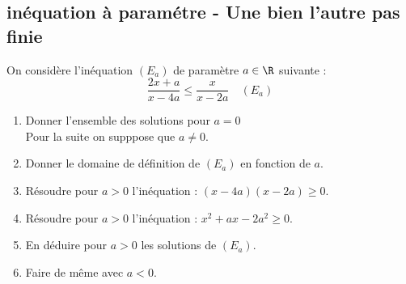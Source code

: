 \subsection{inéquation à paramétre - Une bien l'autre pas finie}

\begin{exercice}
On considère l'inéquation $(E_a)$ de paramètre $a\in \R$ suivante  :
$$ \frac{2x+a}{x-4a}  \leq \frac{x}{x-2a} \quad (E_a)$$

\begin{enumerate}
\item Donner l'ensemble des solutions pour $a=0$\\

Pour la suite on supppose que $a\neq 0$.
\item Donner le domaine de définition de $(E_a)$ en fonction de $a$. 
\item Résoudre pour $a>0$ l'inéquation : $(x-4a)(x-2a)\geq 0$.
\item Résoudre pour $a>0$ l'inéquation : $x^2+ax-2a^2\geq 0$.
\item En déduire pour $a>0$ les solutions de $(E_a)$. 
\item Faire de même avec $a<0$. 
\end{enumerate}
\end{exercice}
